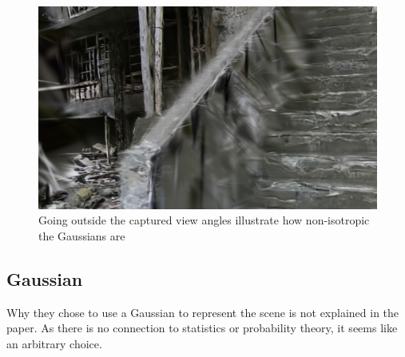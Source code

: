 \begin{figure}
    \centering
    \includegraphics[width=\linewidth]{images/very_isotropic.png}
    \caption{Going outside the captured view angles illustrate how non-isotropic the Gaussians are \cite{@nekoHashimaIslandCreated2023}}
    \label{fig:very_isotropic}
\end{figure}

\subsection{Gaussian}
Why they chose to use a Gaussian to represent the scene is not explained in the paper.
As there is no connection to statistics or probability theory, it seems like an arbitrary choice.

